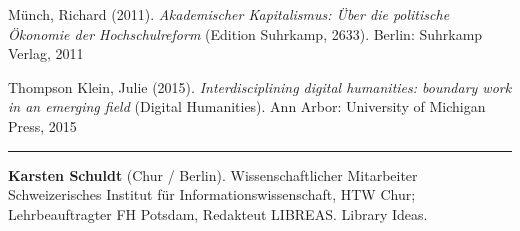 \documentclass[a4paper,
fontsize=11pt,
oneside,
numbers=noperiodatend,
parskip=half-,
bibliography=totoc,
final
]{scrartcl}
\begin{document}
Münch, Richard (2011). \emph{Akademischer Kapitalismus: Über die
politische Ökonomie der Hochschulreform} (Edition Suhrkamp, 2633).
Berlin: Suhrkamp Verlag, 2011

Thompson Klein, Julie (2015). \emph{Interdisciplining digital
humanities: boundary work in an emerging field} (Digital Humanities).
Ann Arbor: University of Michigan Press, 2015

\begin{center}\rule{0.5\linewidth}{\linethickness}\end{center}

\textbf{Karsten Schuldt} (Chur / Berlin). Wissenschaftlicher Mitarbeiter
Schweizerisches Institut für Informationswissenschaft, HTW Chur;
Lehrbeauftragter FH Potsdam, Redakteut LIBREAS. Library Ideas.
\end{document}
